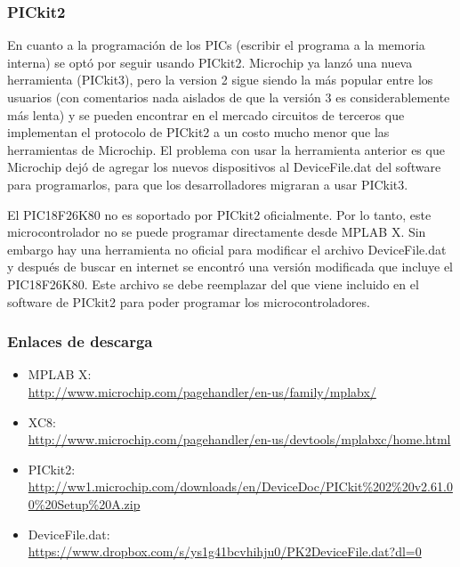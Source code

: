 \subsubsection{PICkit2}
En cuanto a la programación de los PICs (escribir el programa a la memoria interna) se optó por seguir usando PICkit2. Microchip ya lanzó una nueva herramienta (PICkit3), pero la version 2 sigue siendo la más popular entre los usuarios (con comentarios nada aislados de que la versión 3 es considerablemente más lenta) y se pueden encontrar en el mercado circuitos de terceros que implementan el protocolo de PICkit2 a un costo mucho menor que las herramientas de Microchip. El problema con usar la herramienta anterior es que Microchip dejó de agregar los nuevos dispositivos al DeviceFile.dat del software para programarlos, para que los desarrolladores migraran a usar PICkit3.

El PIC18F26K80 no es soportado por PICkit2 oficialmente. Por lo tanto, este microcontrolador no se puede programar directamente desde MPLAB X. Sin embargo hay una herramienta no oficial para modificar el archivo DeviceFile.dat y después de buscar en internet se encontró una versión modificada que incluye el PIC18F26K80. Este archivo se debe reemplazar del que viene incluido en el software de PICkit2 para poder programar los microcontroladores.

\subsubsection{Enlaces de descarga}
\begin{itemize}
\item MPLAB X:\\ {\scriptsize\href{http://www.microchip.com/pagehandler/en-us/family/mplabx/}{http://www.microchip.com/pagehandler/en-us/family/mplabx/}}
\item XC8:\\ {\scriptsize\href{http://www.microchip.com/pagehandler/en-us/devtools/mplabxc/home.html}{http://www.microchip.com/pagehandler/en-us/devtools/mplabxc/home.html}}
\item PICkit2:\\ {\scriptsize\href{http://ww1.microchip.com/downloads/en/DeviceDoc/PICkit\%202\%20v2.61.00\%20Setup\%20A.zip}{http://ww1.microchip.com/downloads/en/DeviceDoc/PICkit\%202\%20v2.61.00\%20Setup\%20A.zip}}
\item DeviceFile.dat:\\ {\scriptsize\href{https://www.dropbox.com/s/ys1g41bcvhihju0/PK2DeviceFile.dat?dl=0}{https://www.dropbox.com/s/ys1g41bcvhihju0/PK2DeviceFile.dat?dl=0}}
\end{itemize}

